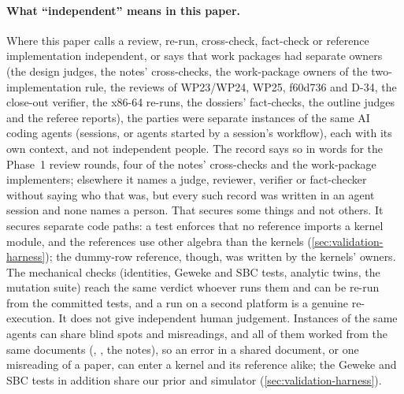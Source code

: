 \paragraph{What ``independent'' means in this paper.}
Where this paper calls a review, re-run, cross-check, fact-check or reference implementation
independent, or says that work packages had separate owners (the design judges, the notes'
cross-checks, the work-package owners of the two-implementation rule, the reviews of WP23/WP24,
WP25, f60d736 and D-34, the close-out verifier, the x86-64 re-runs, the dossiers' fact-checks, the
outline judges and the referee reports), the parties were separate instances of the same AI coding
agents (sessions, or agents started by a session's workflow), each with its own context, and not
independent people.
The record says so in words for the Phase~1 review rounds, four of the notes' cross-checks and the
work-package implementers; elsewhere it names a judge, reviewer, verifier or fact-checker without
saying who that was, but every such record was written in an agent session and none names a person.
That secures some things and not others.
It secures separate code paths: a test enforces that no reference imports a kernel module, and the
references use other algebra than the kernels (\cref{sec:validation-harness}); the dummy-row
reference, though, was written by the kernels' owners.
The mechanical checks (identities, Geweke and SBC tests, analytic twins, the mutation suite) reach
the same verdict whoever runs them and can be re-run from the committed tests, and a run on a second
platform is a genuine re-execution.
It does not give independent human judgement.
Instances of the same agents can share blind spots and misreadings, and all of them worked from the
same documents (, , the notes), so an error in a shared document, or
one misreading of a paper, can enter a kernel and its reference alike; the Geweke and SBC tests in
addition share our prior and simulator (\cref{sec:validation-harness}).
